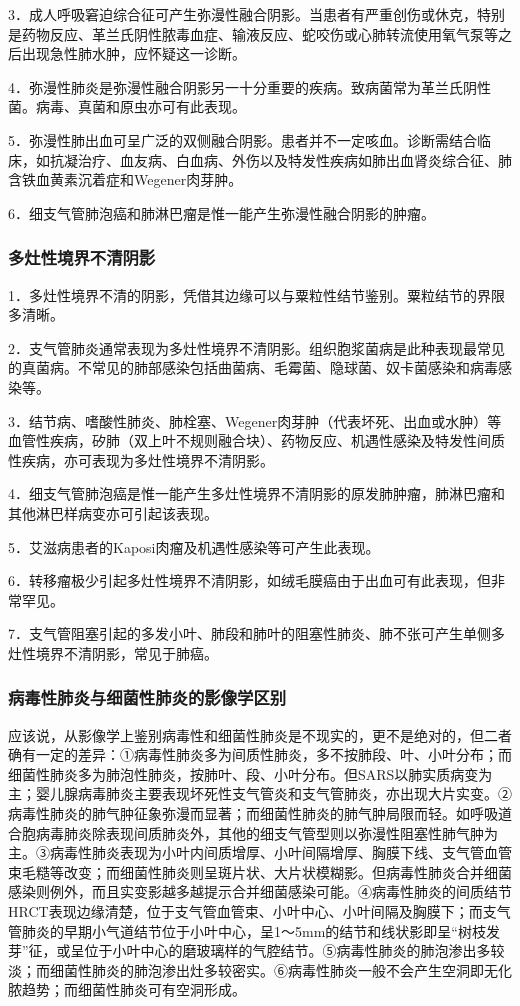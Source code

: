 3．成人呼吸窘迫综合征可产生弥漫性融合阴影。当患者有严重创伤或休克，特别是药物反应、革兰氏阴性脓毒血症、输液反应、蛇咬伤或心肺转流使用氧气泵等之后出现急性肺水肿，应怀疑这一诊断。

4．弥漫性肺炎是弥漫性融合阴影另一十分重要的疾病。致病菌常为革兰氏阴性菌。病毒、真菌和原虫亦可有此表现。

5．弥漫性肺出血可呈广泛的双侧融合阴影。患者并不一定咳血。诊断需结合临床，如抗凝治疗、血友病、白血病、外伤以及特发性疾病如肺出血肾炎综合征、肺含铁血黄素沉着症和Wegener肉芽肿。

6．细支气管肺泡癌和肺淋巴瘤是惟一能产生弥漫性融合阴影的肿瘤。

\subsubsection{多灶性境界不清阴影}

1．多灶性境界不清的阴影，凭借其边缘可以与粟粒性结节鉴别。粟粒结节的界限多清晰。

2．支气管肺炎通常表现为多灶性境界不清阴影。组织胞浆菌病是此种表现最常见的真菌病。不常见的肺部感染包括曲菌病、毛霉菌、隐球菌、奴卡菌感染和病毒感染等。

3．结节病、嗜酸性肺炎、肺栓塞、Wegener肉芽肿（代表坏死、出血或水肿）等血管性疾病，矽肺（双上叶不规则融合块）、药物反应、机遇性感染及特发性间质性疾病，亦可表现为多灶性境界不清阴影。

4．细支气管肺泡癌是惟一能产生多灶性境界不清阴影的原发肺肿瘤，肺淋巴瘤和其他淋巴样病变亦可引起该表现。

5．艾滋病患者的Kaposi肉瘤及机遇性感染等可产生此表现。

6．转移瘤极少引起多灶性境界不清阴影，如绒毛膜癌由于出血可有此表现，但非常罕见。

7．支气管阻塞引起的多发小叶、肺段和肺叶的阻塞性肺炎、肺不张可产生单侧多灶性境界不清阴影，常见于肺癌。

\subsubsection{病毒性肺炎与细菌性肺炎的影像学区别}

应该说，从影像学上鉴别病毒性和细菌性肺炎是不现实的，更不是绝对的，但二者确有一定的差异：①病毒性肺炎多为间质性肺炎，多不按肺段、叶、小叶分布；而细菌性肺炎多为肺泡性肺炎，按肺叶、段、小叶分布。但SARS以肺实质病变为主；婴儿腺病毒肺炎主要表现坏死性支气管炎和支气管肺炎，亦出现大片实变。②病毒性肺炎的肺气肿征象弥漫而显著；而细菌性肺炎的肺气肿局限而轻。如呼吸道合胞病毒肺炎除表现间质肺炎外，其他的细支气管型则以弥漫性阻塞性肺气肿为主。③病毒性肺炎表现为小叶内间质增厚、小叶间隔增厚、胸膜下线、支气管血管束毛糙等改变；而细菌性肺炎则呈斑片状、大片状模糊影。但病毒性肺炎合并细菌感染则例外，而且实变影越多越提示合并细菌感染可能。④病毒性肺炎的间质结节HRCT表现边缘清楚，位于支气管血管束、小叶中心、小叶间隔及胸膜下；而支气管肺炎的早期小气道结节位于小叶中心，呈1～5mm的结节和线状影即呈“树枝发芽”征，或呈位于小叶中心的磨玻璃样的气腔结节。⑤病毒性肺炎的肺泡渗出多较淡；而细菌性肺炎的肺泡渗出灶多较密实。⑥病毒性肺炎一般不会产生空洞即无化脓趋势；而细菌性肺炎可有空洞形成。


